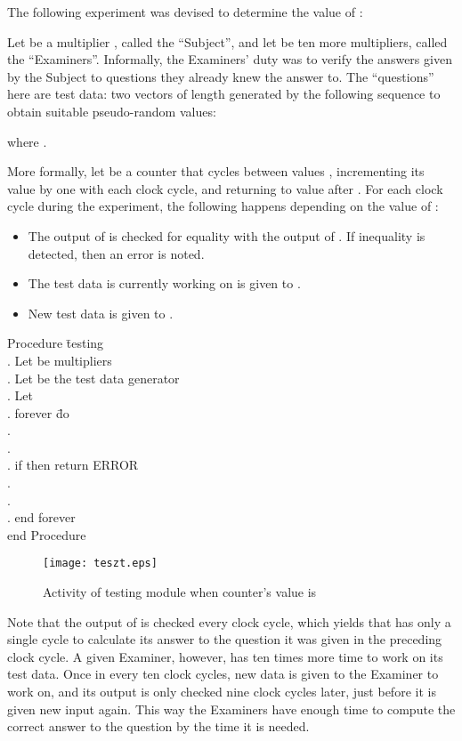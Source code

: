 \documentclass[11pt,twoside]{article}
\begin{document}
The following experiment was devised to determine the value of :

Let  be a multiplier , called the ``Subject'', and let  be ten more  multipliers, called the ``Examiners''. Informally, the Examiners' duty was to verify the answers given by the Subject to questions they already knew the answer to. The ``questions'' here are test data: two vectors  of length  generated by the following sequence to obtain suitable pseudo-random values:

where .

More formally, let  be a counter that cycles between values , incrementing its value by one with each clock cycle, and returning to value  after . For each clock cycle during the experiment, the following happens depending on the value of :
\begin{itemize}
\item The output of  is checked for equality with the output of . If inequality is detected, then an error is noted.
\item The test data  is currently working on is given to .
\item New test data is given to .
\end{itemize}

\begin{tabbing}
Procedure \= testing \\
. Let  be  multipliers \\
. Let  be the test data generator \\
. Let  \\
. forever \= do \\
\> .  \\
\> .  \\
\> . if  then return ERROR \\
\> .  \\
\> .  \\
. end forever \\
end Procedure \\
\end{tabbing}

\begin{figure}[h!]
\centering
\texttt{[image: teszt.eps]}
\caption{Activity of testing module when counter's value is }
\end{figure}

Note that the output of  is checked every clock cycle, which yields that  has only a single cycle to calculate its answer to the question it was given in the preceding clock cycle. A given Examiner, however, has ten times more time to work on its test data. Once in every ten clock cycles, new data is given to the Examiner to work on, and its output is only checked nine clock cycles later, just before it is given new input again. This way the Examiners have enough time to compute the correct answer to the question by the time it is needed.
\end{document}
